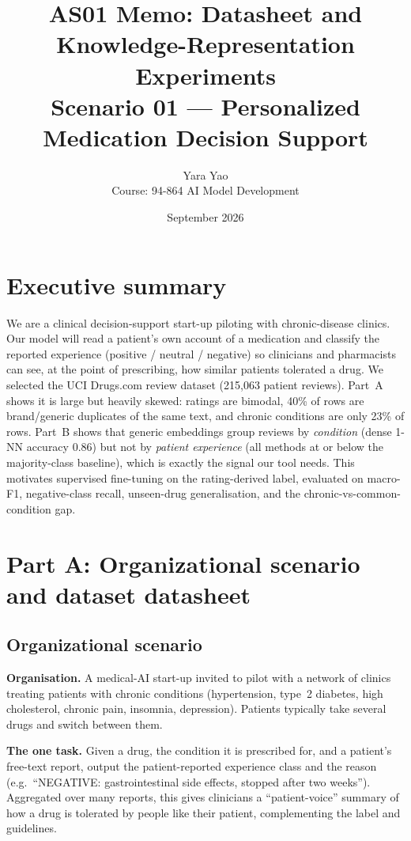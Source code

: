 \documentclass[11pt]{article}
\title{\vspace{-1.5em}\textbf{AS01 Memo: Datasheet and Knowledge-Representation Experiments}\\
\large Scenario 01 --- Personalized Medication Decision Support}
\author{Yara Yao \\ Course: 94-864 AI Model Development}
\date{September 2026}
\begin{document}
\maketitle
\vspace{-1.5em}

\section*{Executive summary}
We are a clinical decision-support start-up piloting with chronic-disease clinics. Our model will read a patient's own account of a medication and classify the reported experience (positive / neutral / negative) so clinicians and pharmacists can see, at the point of prescribing, how similar patients tolerated a drug. We selected the UCI Drugs.com review dataset (215,063 patient reviews). Part~A shows it is large but heavily skewed: ratings are bimodal, 40\% of rows are brand/generic duplicates of the same text, and chronic conditions are only 23\% of rows. Part~B shows that generic embeddings group reviews by \emph{condition} (dense 1-NN accuracy 0.86) but not by \emph{patient experience} (all methods at or below the majority-class baseline), which is exactly the signal our tool needs. This motivates supervised fine-tuning on the rating-derived label, evaluated on macro-F1, negative-class recall, unseen-drug generalisation, and the chronic-vs-common-condition gap.

\section{Part A: Organizational scenario and dataset datasheet}

\subsection{Organizational scenario}
\textbf{Organisation.} A medical-AI start-up invited to pilot with a network of clinics treating patients with chronic conditions (hypertension, type~2 diabetes, high cholesterol, chronic pain, insomnia, depression). Patients typically take several drugs and switch between them.

\textbf{The one task.} Given a drug, the condition it is prescribed for, and a patient's free-text report, output the patient-reported experience class and the reason (e.g.\ ``NEGATIVE: gastrointestinal side effects, stopped after two weeks''). Aggregated over many reports, this gives clinicians a ``patient-voice'' summary of how a drug is tolerated by people like their patient, complementing the label and guidelines.
\end{document}
